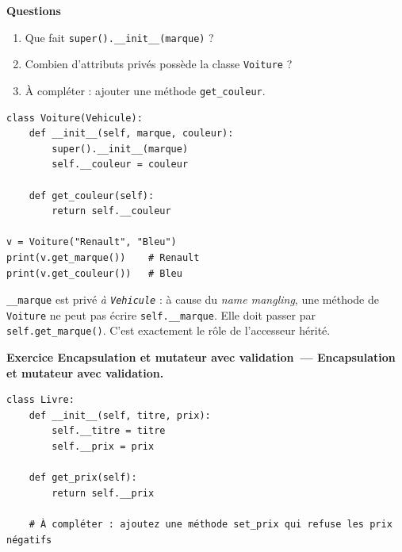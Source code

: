 \documentclass[11pt,a4paper]{article}
\newif\ifcorrige
\newcommand{\py}[1]{\texttt{#1}}
\newcounter{exo}[section]
\renewcommand{\theexo}{\arabic{exo}}
\newcommand{\exo}[2][]{%
  \Needspace{5cm}\stepcounter{exo}%
  \begin{quest}\textbf{Exercice \theexo\ifx\relax#1\relax\else\ — #1\fi.}
  \ifx\relax#2\relax\else\ #2\fi\end{quest}}
\newcommand{\rep}[1]{%
  \ifcorrige
    \par\smallskip{\color{corr}\small#1}\par\smallskip
  \else
    \par\nobreak\vspace{1mm}\noindent\color{black!55}\dotfill\par
    \noindent\color{black!55}\dotfill\par\color{black}\vspace{1mm}
  \fi}
\newcommand{\zonecode}[1][4cm]{%
  \ifcorrige\else
    \par\smallskip\noindent
    \begin{tcolorbox}[colback=white,colframe=black!45,boxrule=0.5pt,arc=1pt,height=#1]\end{tcolorbox}%
  \fi}
\newenvironment{solution}
  {\ifcorrige
     \begin{tcolorbox}[enhanced,breakable,colback=corrbg,colframe=corr,boxrule=0.6pt,arc=1pt,
       left=5pt,right=5pt,top=4pt,bottom=4pt,
       title={Corrigé},coltitle=corr,fonttitle=\bfseries\small,detach title,
       before upper={\tcbtitle\par\smallskip},fontupper=\small]%
   \else
     \setbox0\vbox\bgroup
   \fi}
  {\ifcorrige\end{tcolorbox}\else\egroup\fi}
\begin{document}
\textbf{Questions}
\begin{enumerate}
  \item Que fait \py{super().__init__(marque)} ?
    \rep{Il appelle le constructeur de la classe mère \py{Vehicule} pour initialiser la partie
    héritée de l'objet, ici l'attribut privé \py{__marque}. Sans cet appel, \py{get_marque}
    échouerait car l'attribut n'aurait jamais été créé.}
  \item Combien d'attributs privés possède la classe \py{Voiture} ?
    \rep{Deux au total dans l'objet : \py{_Vehicule__marque}, hérité et initialisé par
    \py{super()}, et \py{_Voiture__couleur}, propre à \py{Voiture}. La classe \py{Voiture} n'en
    déclare qu'un seul elle-même.}
  \item À compléter : ajouter une méthode \py{get_couleur}.
\end{enumerate}
\zonecode[4cm]
\begin{solution}
\begin{lstlisting}
class Voiture(Vehicule):
    def __init__(self, marque, couleur):
        super().__init__(marque)
        self.__couleur = couleur

    def get_couleur(self):
        return self.__couleur

v = Voiture("Renault", "Bleu")
print(v.get_marque())    # Renault
print(v.get_couleur())   # Bleu
\end{lstlisting}
\begin{piege}
\py{__marque} est privé \emph{à \py{Vehicule}} : à cause du \emph{name mangling},
une méthode de \py{Voiture} ne peut pas écrire \py{self.__marque}. Elle doit passer par
\py{self.get_marque()}. C'est exactement le rôle de l'accesseur hérité.
\end{piege}
\end{solution}

\exo[Encapsulation et mutateur avec validation]{}

\begin{lstlisting}
class Livre:
    def __init__(self, titre, prix):
        self.__titre = titre
        self.__prix = prix

    def get_prix(self):
        return self.__prix

    # À compléter : ajoutez une méthode set_prix qui refuse les prix négatifs
\end{lstlisting}
\end{document}

